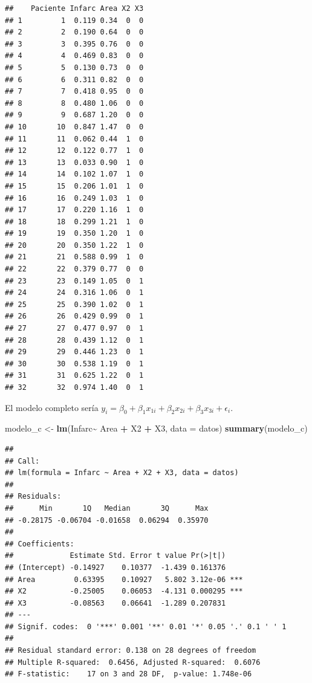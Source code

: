 \documentclass[
]{book}
\newenvironment{Shaded}{\begin{snugshade}}{\end{snugshade}}
\newcommand{\AttributeTok}[1]{\textcolor[rgb]{0.13,0.29,0.53}{#1}}
\newcommand{\FunctionTok}[1]{\textcolor[rgb]{0.13,0.29,0.53}{\textbf{#1}}}
\newcommand{\NormalTok}[1]{#1}
\newcommand{\OtherTok}[1]{\textcolor[rgb]{0.56,0.35,0.01}{#1}}
\newcommand{\SpecialCharTok}[1]{\textcolor[rgb]{0.81,0.36,0.00}{\textbf{#1}}}
\begin{document}
\begin{verbatim}
##    Paciente Infarc Area X2 X3
## 1         1  0.119 0.34  0  0
## 2         2  0.190 0.64  0  0
## 3         3  0.395 0.76  0  0
## 4         4  0.469 0.83  0  0
## 5         5  0.130 0.73  0  0
## 6         6  0.311 0.82  0  0
## 7         7  0.418 0.95  0  0
## 8         8  0.480 1.06  0  0
## 9         9  0.687 1.20  0  0
## 10       10  0.847 1.47  0  0
## 11       11  0.062 0.44  1  0
## 12       12  0.122 0.77  1  0
## 13       13  0.033 0.90  1  0
## 14       14  0.102 1.07  1  0
## 15       15  0.206 1.01  1  0
## 16       16  0.249 1.03  1  0
## 17       17  0.220 1.16  1  0
## 18       18  0.299 1.21  1  0
## 19       19  0.350 1.20  1  0
## 20       20  0.350 1.22  1  0
## 21       21  0.588 0.99  1  0
## 22       22  0.379 0.77  0  0
## 23       23  0.149 1.05  0  1
## 24       24  0.316 1.06  0  1
## 25       25  0.390 1.02  0  1
## 26       26  0.429 0.99  0  1
## 27       27  0.477 0.97  0  1
## 28       28  0.439 1.12  0  1
## 29       29  0.446 1.23  0  1
## 30       30  0.538 1.19  0  1
## 31       31  0.625 1.22  0  1
## 32       32  0.974 1.40  0  1
\end{verbatim}

El modelo completo sería \(y_i = \beta_0 + \beta_1x_{1i} +\beta_2x_{2i} + \beta_3x_{3i}+\epsilon_i\).

\begin{Shaded}
\begin{Highlighting}[]
\NormalTok{modelo\_c }\OtherTok{\textless{}{-}} \FunctionTok{lm}\NormalTok{(Infarc}\SpecialCharTok{\textasciitilde{}}\NormalTok{ Area }\SpecialCharTok{+}\NormalTok{ X2 }\SpecialCharTok{+}\NormalTok{ X3, }\AttributeTok{data =}\NormalTok{ datos)}
\FunctionTok{summary}\NormalTok{(modelo\_c)}
\end{Highlighting}
\end{Shaded}

\begin{verbatim}
## 
## Call:
## lm(formula = Infarc ~ Area + X2 + X3, data = datos)
## 
## Residuals:
##      Min       1Q   Median       3Q      Max 
## -0.28175 -0.06704 -0.01658  0.06294  0.35970 
## 
## Coefficients:
##             Estimate Std. Error t value Pr(>|t|)    
## (Intercept) -0.14927    0.10377  -1.439 0.161376    
## Area         0.63395    0.10927   5.802 3.12e-06 ***
## X2          -0.25005    0.06053  -4.131 0.000295 ***
## X3          -0.08563    0.06641  -1.289 0.207831    
## ---
## Signif. codes:  0 '***' 0.001 '**' 0.01 '*' 0.05 '.' 0.1 ' ' 1
## 
## Residual standard error: 0.138 on 28 degrees of freedom
## Multiple R-squared:  0.6456, Adjusted R-squared:  0.6076 
## F-statistic:    17 on 3 and 28 DF,  p-value: 1.748e-06
\end{verbatim}
\end{document}
